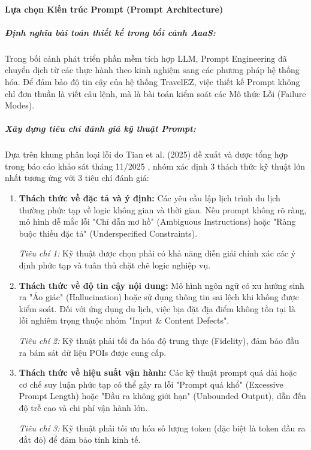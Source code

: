 \paragraph{Lựa chọn Kiến trúc Prompt (Prompt Architecture)}

\subparagraph{Định nghĩa bài toán thiết kế trong bối cảnh AaaS:}

Trong bối cảnh phát triển phần mềm tích hợp LLM, Prompt Engineering đã chuyển dịch từ các thực hành theo kinh nghiệm sang các phương pháp hệ thống hóa. Để đảm bảo độ tin cậy của hệ thống TravelEZ, việc thiết kế Prompt không chỉ đơn thuần là viết câu lệnh, mà là bài toán kiểm soát các Mô thức Lỗi (Failure Modes).

\subparagraph{Xây dựng tiêu chí đánh giá kỹ thuật Prompt:}

Dựa trên khung phân loại lỗi do Tian et al. (2025) đề xuất và được tổng hợp trong báo cáo khảo sát tháng 11/2025 \cite{tian2025llm}, nhóm xác định 3 thách thức kỹ thuật lớn nhất tương ứng với 3 tiêu chí đánh giá:

\begin{enumerate}[label=\alph*., leftmargin=*]
    \item \textbf{Thách thức về đặc tả và ý định:} Các yêu cầu lập lịch trình du lịch thường phức tạp về logic không gian và thời gian. Nếu prompt không rõ ràng, mô hình dễ mắc lỗi "Chỉ dẫn mơ hồ" (Ambiguous Instructions) hoặc "Ràng buộc thiếu đặc tả" (Underspecified Constraints).
    
    \textit{Tiêu chí 1:} Kỹ thuật được chọn phải có khả năng diễn giải chính xác các ý định phức tạp và tuân thủ chặt chẽ logic nghiệp vụ.
    
    \item \textbf{Thách thức về độ tin cậy nội dung:} Mô hình ngôn ngữ có xu hướng sinh ra "Ảo giác" (Hallucination) hoặc sử dụng thông tin sai lệch khi không được kiểm soát. Đối với ứng dụng du lịch, việc bịa đặt địa điểm không tồn tại là lỗi nghiêm trọng thuộc nhóm "Input \& Content Defects".
    
    \textit{Tiêu chí 2:} Kỹ thuật phải tối đa hóa độ trung thực (Fidelity), đảm bảo đầu ra bám sát dữ liệu POIs được cung cấp.
    
    \item \textbf{Thách thức về hiệu suất vận hành:} Các kỹ thuật prompt quá dài hoặc cơ chế suy luận phức tạp có thể gây ra lỗi "Prompt quá khổ" (Excessive Prompt Length) hoặc "Đầu ra không giới hạn" (Unbounded Output), dẫn đến độ trễ cao và chi phí vận hành lớn.
    
    \textit{Tiêu chí 3:} Kỹ thuật phải tối ưu hóa số lượng token (đặc biệt là token đầu ra đắt đỏ) để đảm bảo tính kinh tế.
\end{enumerate}

